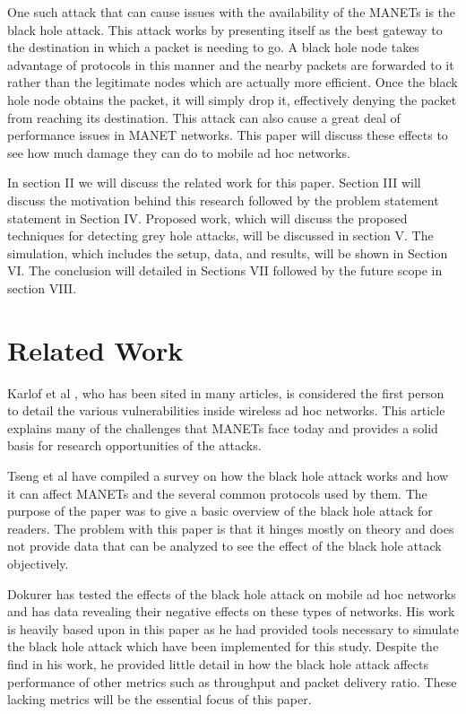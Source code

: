 \documentclass[conference,12pt]{IEEEtran}
\begin{document}
One such attack that can cause issues with the availability of the MANETs is the black hole attack. This attack works by presenting itself as the best gateway to the destination in which a packet is needing to go. A black hole node takes advantage of protocols in this manner and the nearby packets are forwarded to it rather than the legitimate nodes which are actually more efficient. Once the black hole node obtains the packet, it will simply drop it, effectively denying the packet from reaching its destination. This attack can also cause a great deal of performance issues in MANET networks. This paper will discuss these effects to see how much damage they can do to mobile ad hoc networks. 

In section II we will discuss the related work for this paper. Section III will discuss the motivation behind this research followed by the problem statement statement in Section IV. Proposed work, which will discuss the proposed techniques for detecting grey hole attacks, will be discussed in section V. The simulation, which includes the setup, data, and results, will be shown in Section VI. The conclusion will detailed in Sections VII followed by the future scope in section VIII.


\section{Related Work}
Karlof et al \cite{Karlof}, who has been sited in many articles, is considered the first person to detail the various vulnerabilities inside wireless ad hoc networks. This article explains many of the challenges that MANETs face today and provides a solid basis for research opportunities of the attacks. 

Tseng et al \cite{Tseng} have compiled a survey on how the black hole attack works and how it can affect MANETs and the several common protocols used by them. The purpose of the paper was to give a basic overview of the black hole attack for readers. The problem with this paper is that it hinges mostly on theory and does not provide data that can be analyzed to see the effect of the black hole attack objectively.

Dokurer \cite{Dokurer} has tested the effects of the black hole attack on mobile ad hoc networks and has data revealing their negative effects on these types of networks. His work is heavily based upon in this paper as he had provided tools necessary to simulate the black hole attack which have been implemented for this study. Despite the find in his work, he provided little detail in how the black hole attack affects performance of other metrics such as throughput and packet delivery ratio. These lacking metrics will be the essential focus of this paper.
\end{document}
